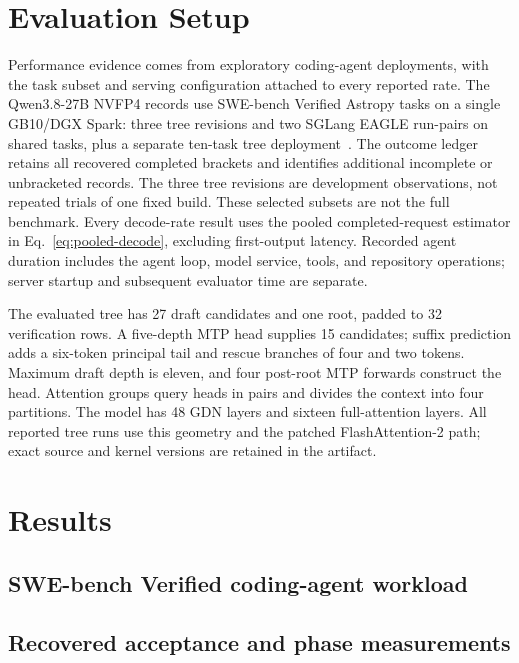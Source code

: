 \documentclass[conference]{IEEEtran}
\begin{document}
\section{Evaluation Setup}
\label{sec:protocol}
Performance evidence comes from exploratory coding-agent deployments, with the task subset and serving configuration attached to every reported rate. The Qwen3.8-27B NVFP4 records use SWE-bench Verified Astropy tasks on a single GB10/DGX Spark: three tree revisions and two SGLang EAGLE run-pairs on shared tasks, plus a separate ten-task tree deployment~\cite{lumo2026archive,jimenez2024swe}. The outcome ledger retains all recovered completed brackets and identifies additional incomplete or unbracketed records. The three tree revisions are development observations, not repeated trials of one fixed build. These selected subsets are not the full benchmark. Every decode-rate result uses the pooled completed-request estimator in Eq.~\ref{eq:pooled-decode}, excluding first-output latency. Recorded agent duration includes the agent loop, model service, tools, and repository operations; server startup and subsequent evaluator time are separate.

The evaluated tree has 27 draft candidates and one root, padded to 32 verification rows. A five-depth MTP head supplies 15 candidates; suffix prediction adds a six-token principal tail and rescue branches of four and two tokens. Maximum draft depth is eleven, and four post-root MTP forwards construct the head. Attention groups query heads in pairs and divides the context into four partitions. The model has 48 GDN layers and sixteen full-attention layers. All reported tree runs use this geometry and the patched FlashAttention-2 path; exact source and kernel versions are retained in the artifact.



\section{Results}
\label{sec:results}
\subsection{SWE-bench Verified coding-agent workload}
\label{sec:agent-workload}


\subsection{Recovered acceptance and phase measurements}

\end{document}

